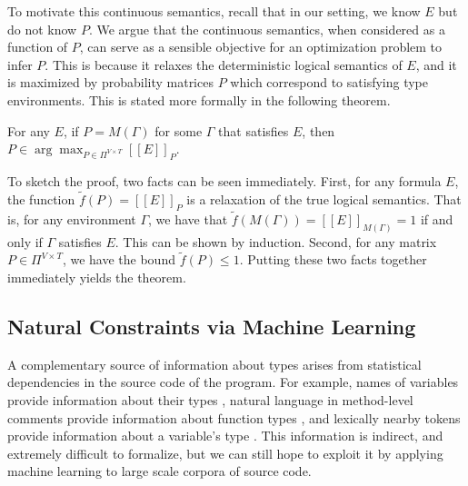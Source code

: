 \documentclass[sigplan,10pt,review,anonymous]{acmart}
\newcommand{\qqpi}[2]{[\![#2]\!]_{#1}}
\theoremstyle{plain}
\theoremstyle{remark}
\theoremstyle{definition}
\begin{document}
To motivate this continuous semantics, recall that in our setting, we know $E$ but
do not know $P$. We argue that the continuous semantics,
when considered as a function of $P$, can serve as a sensible
objective for an optimization problem to infer $P.$ This is because it relaxes
the deterministic logical semantics of $E$, and it is maximized
by probability matrices $P$ which correspond to satisfying type environments. This is stated
more formally in the following theorem.
\begin{theorem}
    For any $E$, if $P = M(\Gamma)$ for some $\Gamma$ that satisfies $E$, then $P \in \arg\max_{P \in \Pi^{V \times T}} \qqpi{P}{E}$.
\end{theorem}

To sketch the proof, two facts can be seen immediately.
First, for any formula $E$, the function $\tilde{f}(P) = \qqpi{P}{E}$ is a relaxation
of the true logical semantics. That is, for any environment $\Gamma$, we have that
$\tilde{f}(M(\Gamma)) = \qqpi{M(\Gamma)}{E} = 1$ if and only if $\Gamma$ satisfies $E.$ This can be shown
by induction. Second, for any matrix $P \in \Pi^{V \times T}$,
we have the bound $\tilde{f}(P) \leq 1$. Putting these two facts together
immediately yields the theorem.


\subsection{Natural Constraints via Machine Learning}\label{ssec:natcon}

A complementary source of information about types arises from statistical dependencies 
in the source code of the program.  For example, names of variables provide
information about their types \cite{xu16}, natural language in 
method-level comments provide information about function types \cite{malik19},
and lexically nearby tokens provide information
about a variable's type \cite{hellendoorn18}.
This information is indirect, and extremely difficult to formalize,
but we can still hope to exploit it by applying machine learning
to large scale corpora of source code.
\end{document}
